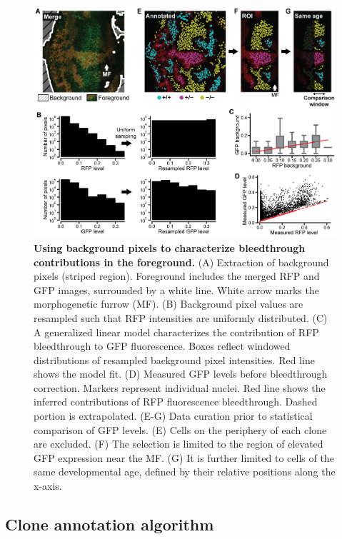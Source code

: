 \begin{figure}[h]
\includegraphics[scale=1.0]{./figure_S2}
\caption[Characterization of bleedthrough contribution strengths.]{\textbf{Using background pixels to characterize bleedthrough contributions in the foreground.} (A) Extraction of background pixels (striped region). Foreground includes the merged RFP and GFP images, surrounded by a white line. White arrow marks the morphogenetic furrow (MF). (B) Background pixel values are resampled such that RFP intensities are uniformly distributed. (C) A generalized linear model characterizes the contribution of RFP bleedthrough to GFP fluorescence. Boxes reflect windowed distributions of resampled background pixel intensities. Red line shows the model fit. (D) Measured GFP levels before bleedthrough correction. Markers represent individual nuclei. Red line shows the inferred contributions of RFP fluorescence bleedthrough. Dashed portion is extrapolated. (E-G) Data curation prior to statistical comparison of GFP levels. (E) Cells on the periphery of each clone are excluded. (F) The selection is limited to the region of elevated GFP expression near the MF. (G) It is further limited to cells of the same developmental age, defined by their relative positions along the x-axis.}
\label{fig:figS2}
\end{figure}

\subsection{Clone annotation algorithm} 

